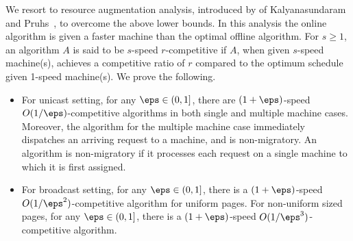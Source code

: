 We resort to resource augmentation analysis, introduced by of
Kalyanasundaram and Pruhs~\cite{KalyanasundaramP95}, to overcome the
above lower bounds. In this analysis the online algorithm is given a
faster machine than the optimal offline algorithm. For $s \ge 1$, an
algorithm $A$ is said to be $s$-speed $r$-competitive if $A$, when
given $s$-speed machine(s), achieves a competitive ratio of $r$
compared to the optimum  schedule given 1-speed machine(s).
We prove the following.
\begin{itemize}
\item For unicast setting, for any $\eps \in (0,1]$, there are
  $(1+\eps)$-speed $O(1/\eps)$-competitive algorithms in both single
  and multiple machine cases. Moreover, the algorithm for the multiple
  machine case immediately dispatches an arriving request to a
  machine, and is non-migratory. An algorithm is non-migratory
  if it processes each request on a single machine to which it is
  first assigned.

\item For broadcast setting, for any $\eps \in (0,1]$, there is a
  $(1+\eps)$-speed $O(1/\eps^2)$-competitive algorithm for uniform
  pages.  For non-uniform sized pages, for any $\eps \in (0,1]$, there
  is a $(1+\eps)$-speed $O(1/\eps^3)$-competitive algorithm.
\end{itemize}
